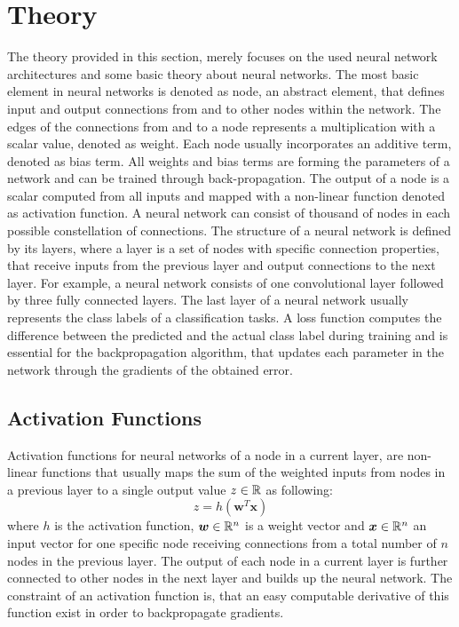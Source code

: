 
\section{Theory}\label{sec:nn_theory}
\thesisStateRevised
\thesisStateNew
The theory provided in this section, merely focuses on the used neural network architectures and some basic theory about neural networks.
The most basic element in neural networks is denoted as node, an abstract element, that defines input and output connections from and to other nodes within the network.
The edges of the connections from and to a node represents a multiplication with a scalar value, denoted as weight.
Each node usually incorporates an additive term, denoted as bias term.
All weights and bias terms are forming the parameters of a network and can be trained through back-propagation.
The output of a node is a scalar computed from all inputs and mapped with a non-linear function denoted as activation function.
A neural network can consist of thousand of nodes in each possible constellation of connections.
The structure of a neural network is defined by its layers, where a layer is a set of nodes with specific connection properties, that receive inputs from the previous layer and output connections to the next layer.
For example, a neural network consists of one convolutional layer followed by three fully connected layers.
The last layer of a neural network usually represents the class labels of a classification tasks.
A loss function computes the difference between the predicted and the actual class label during training and is essential for the backpropagation algorithm, that updates each parameter in the network through the gradients of the obtained error.



\subsection{Activation Functions}\label{sec:nn_theory_acti}
Activation functions for neural networks of a node in a current layer, are non-linear functions that usually maps the sum of the weighted inputs from nodes in a previous layer to a single output value $z \in \mathbb{R}$ as following:
\begin{equation}\label{eq:nn_theory_acti}
  z = h(\bm{w}^T \bm{x})
\end{equation}
where $h$ is the activation function, $\bm{w} \in \mathbb{R}^n$ is a weight vector and $\bm{x} \in \mathbb{R}^n$ an input vector for one specific node receiving connections from a total number of $n$ nodes in the previous layer.
The output of each node in a current layer is further connected to other nodes in the next layer and builds up the neural network.
The constraint of an activation function is, that an easy computable derivative of this function exist in order to backpropagate gradients.

